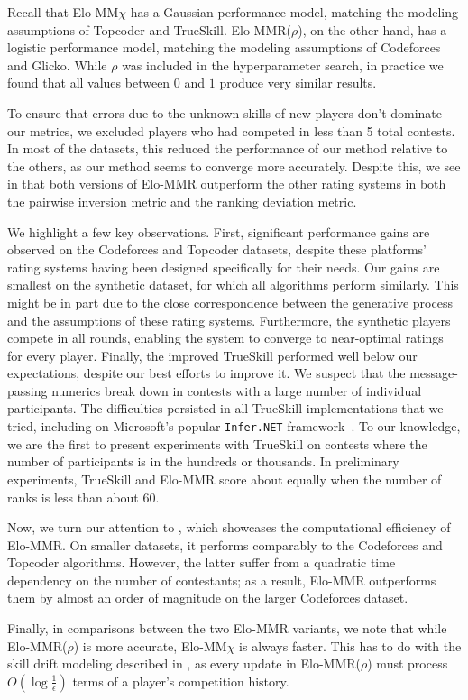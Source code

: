 Recall that Elo-MM$\chi$ has a Gaussian performance model, matching the modeling assumptions of Topcoder and TrueSkill. Elo-MMR($\rho$), on the other hand, has a logistic performance model, matching the modeling assumptions of Codeforces and Glicko. While $\rho$ was included in the hyperparameter search, in practice we found that all values between $0$ and $1$ produce very similar results.

To ensure that errors due to the unknown skills of new players don't dominate our metrics, we excluded players who had competed in less than 5 total contests. In most of the datasets, this reduced the performance of our method relative to the others, as our method seems to converge more accurately. Despite this, we see in  that both versions of Elo-MMR outperform the other rating systems in both the pairwise inversion metric and the ranking deviation metric.

We highlight a few key observations. First, significant performance gains are observed on the Codeforces and Topcoder datasets, despite these platforms' rating systems having been designed specifically for their needs. Our gains are smallest on the synthetic dataset, for which all algorithms perform similarly. This might be in part due to the close correspondence between the generative process and the assumptions of these rating systems. Furthermore, the synthetic players compete in all rounds, enabling the system to converge to near-optimal ratings for every player. Finally, the improved TrueSkill performed well below our expectations, despite our best efforts to improve it. We suspect that the message-passing numerics break down in contests with a large number of individual participants. The difficulties persisted in all TrueSkill implementations that we tried, including on Microsoft's popular {\tt Infer.NET} framework~\cite{InferNET18}. To our knowledge, we are the first to present experiments with TrueSkill on contests where the number of participants is in the hundreds or thousands. In preliminary experiments, TrueSkill and Elo-MMR score about equally when the number of ranks is less than about 60.

Now, we turn our attention to , which showcases the computational efficiency of Elo-MMR. On smaller datasets, it performs comparably to the Codeforces and Topcoder algorithms. However, the latter suffer from a quadratic time dependency on the number of contestants; as a result, Elo-MMR outperforms them by almost an order of magnitude on the larger Codeforces dataset.

Finally, in comparisons between the two Elo-MMR variants, we note that while Elo-MMR($\rho$) is more accurate, Elo-MM$\chi$ is always faster. This has to do with the skill drift modeling described in , as every update in Elo-MMR($\rho$) must process $O(\log\frac 1\epsilon)$ terms of a player's competition history.